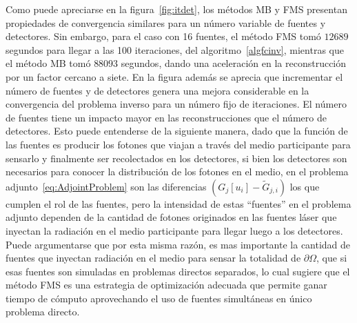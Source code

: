Como puede apreciarse en la figura~\ref{fig:itdet}, los métodos MB y FMS 
presentan propiedades de convergencia similares para un número variable 
de fuentes y detectores. Sin embargo, para el caso con 16 fuentes, 
el método FMS tomó  $12689$ segundos para llegar a las 100 iteraciones, 
del algoritmo~\ref{algfcinv}, mientras que el método MB tomó $88093$ segundos, 
dando una aceleración en la reconstrucción por un factor cercano a siete. 
En la figura además se aprecia que incrementar el número de fuentes y de detectores 
genera una mejora considerable en la convergencia del problema inverso 
para un número fijo de iteraciones. El número de fuentes tiene un impacto 
mayor en las reconstrucciones que el número de detectores. 
Esto puede entenderse de la siguiente manera, dado que la función de las fuentes 
es producir los fotones que viajan a través del medio participante para sensarlo 
y finalmente ser recolectados en los detectores, si bien los detectores son necesarios 
para conocer la distribución de los fotones en el medio, en el problema adjunto~\eqref{eq:AdjointProblem} 
son las diferencias $(G_j[u_i]-\widetilde{G}_{j,i})$ los que cumplen el rol de las fuentes, 
pero la intensidad de estas ``fuentes'' en el problema adjunto dependen de la cantidad 
de fotones originados en las fuentes láser que inyectan la radiación en el medio participante 
para llegar luego a los detectores. Puede argumentarse que por esta misma razón, 
es mas importante la cantidad de fuentes que inyectan radiación en el medio para sensar 
la totalidad de $\partial \Omega$, que si esas fuentes son simuladas en problemas 
directos separados, lo cual sugiere que el método FMS es una estrategia 
de optimización adecuada que permite ganar tiempo de cómputo aprovechando 
el uso de fuentes simultáneas en único problema directo.

